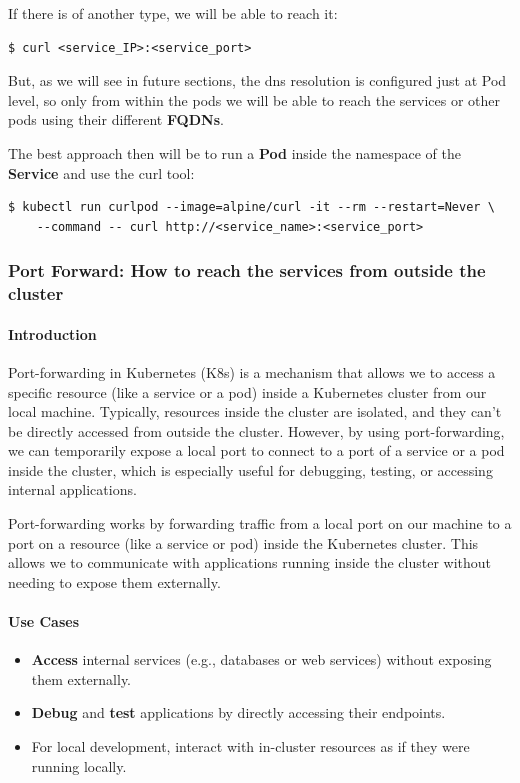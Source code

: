 \documentclass{article}
\newenvironment{codetemplate}[1][]{%
  \mybasecolorbox[#1]
  \itshape
}{%
  \endmybasecolorbox
}
\begin{document}
If there is of another type, we will be able to reach it:
\begin{codetemplate}{}
\begin{verbatim}
$ curl <service_IP>:<service_port>
\end{verbatim}
\end{codetemplate}

But, as we will see in future sections, the dns resolution is configured just at Pod level, so only from within the pods we will be able to reach
the services or other pods using their different \textbf{FQDNs}.

The best approach then will be to run a \textbf{Pod} inside the namespace of the \textbf{Service} and use the curl tool:

\begin{codetemplate}{}
\begin{verbatim}
$ kubectl run curlpod --image=alpine/curl -it --rm --restart=Never \
    --command -- curl http://<service_name>:<service_port>
\end{verbatim}
\end{codetemplate}

\subsubsection{Port Forward: How to reach the services from outside the cluster}
\paragraph{Introduction}
Port-forwarding in Kubernetes (K8s) is a mechanism that allows we to access a specific resource (like a service or a pod) inside a Kubernetes cluster from our local machine. Typically, resources inside the cluster are isolated, and they can't be directly accessed from outside the cluster. However, by using port-forwarding, we can temporarily expose a local port to connect to a port of a service or a pod inside the cluster, which is especially useful for debugging, testing, or accessing internal applications.

Port-forwarding works by forwarding traffic from a local port on our machine to a port on a resource (like a service or pod) inside the Kubernetes cluster. This allows we to communicate with applications running inside the cluster without needing to expose them externally.

\paragraph{Use Cases}
\begin{itemize}
    \item \textbf{Access} internal services (e.g., databases or web services) without exposing them externally.
    \item \textbf{Debug} and \textbf{test} applications by directly accessing their endpoints.
    \item For local development, interact with in-cluster resources as if they were running locally.
\end{itemize}
\end{document}
